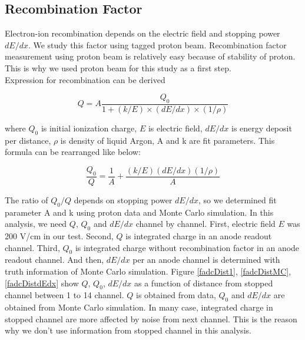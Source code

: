 \subsection{Recombination Factor}
 Electron-ion recombination depends on the electric field and stopping power $dE/dx$. We study this factor using tagged proton beam. Recombination factor measurement using proton beam is relatively easy because of stability of proton. This is why we used proton beam for this study as a first step.\\
  Expression for recombination can be derived 

\begin{equation}
  Q = A\frac{Q_{0}}{1+(k/E)\times(dE/dx)\times(1/\rho)}
\end{equation}

where $Q_{0}$ is initial ionization charge, $E$ is electric field, $dE/dx$ is energy deposit per distance, $\rho$ is density of liquid Argon, A and k are fit parameters. This formula can be rearranged like below:

\begin{equation}
  \frac{Q_{0}}{Q} = \frac{1}{A}+\frac{(k/E)(dE/dx)(1/\rho)}{A}
\end{equation}

The ratio of $Q_{0}/Q$ depends on stopping power $dE/dx$, so we determined fit parameter A and k using proton data and Monte Carlo simulation. In this analysis, we need $Q$, $Q_{0}$ and $dE/dx$ channel by channel. First, electric field $E$ was 200 V/cm in our test. Second, $Q$ is integrated charge in an anode readout channel. Third, $Q_{0}$ is integrated charge without recombination factor in an anode readout channel. And then, $dE/dx$ per an anode channel is determined with truth information of Monte Carlo simulation. Figure \ref{fadcDist1}, \ref{fadcDistMC}, \ref{fadcDistdEdx} show $Q$, $Q_{0}$, $dE/dx$ as a function of distance from stopped channel between 1 to 14 channel. $Q$ is obtained from data, $Q_{0}$ and $dE/dx$ are obtained from Monte Carlo simulation.
In many case, integrated charge in stopped channel are more affected by noise from next channel. This is the reason why we don't use information from stopped channel in this analysis. 

